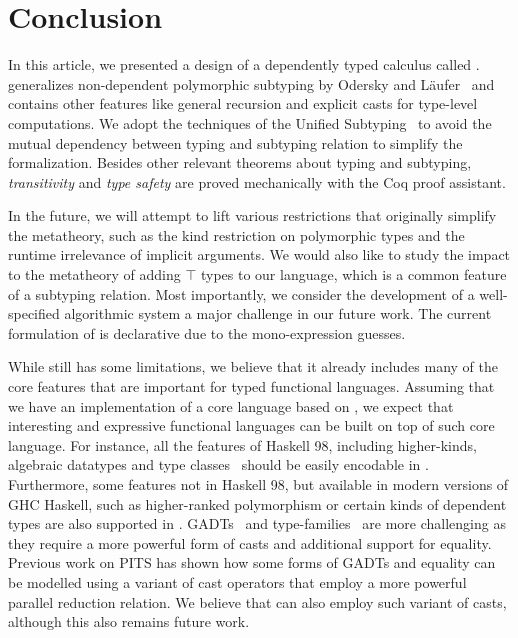 \section{Conclusion}

In this article, we presented a design of a dependently typed calculus called \name.
\name generalizes non-dependent polymorphic subtyping by Odersky and
L\"aufer~\citep{odersky1996putting} and contains other features like general
recursion and explicit casts for type-level computations.
We adopt the techniques of the Unified Subtyping~\citep{full} to
avoid the mutual dependency between typing and subtyping relation to simplify
the formalization. Besides other relevant theorems about typing and subtyping,
\emph{transitivity} and \emph{type safety} are proved mechanically with the Coq
proof assistant.

In the future, we will attempt to lift various restrictions that originally simplify
the metatheory, such as the kind restriction on polymorphic
types and the runtime irrelevance of implicit arguments. We would also like to
study the impact to the metatheory of adding $\top$ types to our language,
which is a common feature of a subtyping relation.
Most importantly, we consider the development
of a well-specified algorithmic system a major challenge in our future
work. The current formulation of \name is declarative due to the mono-expression guesses.

While \name still has some limitations, we believe that it already includes many
of the core features that are important for typed functional languages.
Assuming that we have an implementation of a core language based on \name,
we expect that interesting and expressive functional languages can be built
on top of such core language. For instance, all the features of Haskell 98,
including higher-kinds, algebraic datatypes and type classes~\citep{typeclasseskaes,typeclasseswadler}
should be easily encodable
in \name. Furthermore, some features not in Haskell 98, but available in modern
versions of GHC Haskell, such as higher-ranked polymorphism or certain
kinds of dependent types are also supported in \name. GADTs~\citep{gadt1,gadt2} and
type-families~\citep{typefamilies} are more challenging as they require a more powerful
form of casts and additional support for equality. Previous work on PITS
has shown how some forms of GADTs and equality can be modelled using
a variant of cast operators that employ a more powerful parallel reduction
relation. We believe that \name can also employ such variant of casts,
although this also remains future work.

